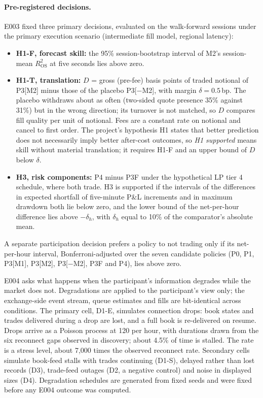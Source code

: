 \documentclass[11pt]{article}
\makeatletter
\newcommand{\bp}{\,bp}
\newcommand{\Rsq}{R^2_{\mathrm{OS}}}
\renewcommand\subsection{\@startsection{subsection}{2}{\z@}{-3ex\@plus -1ex \@minus -.2ex}{1ex \@plus .2ex}{\normalfont\normalsize\bfseries}}
\makeatother
\begin{document}
\paragraph{Pre-registered decisions.} E003 fixed three primary decisions, evaluated on the walk-forward sessions under
the primary execution scenario (intermediate fill model, regional latency):
\begin{itemize}
  \item \textbf{H1-F, forecast skill:} the 95\% session-bootstrap interval of M2's session-mean $\Rsq$ at five seconds
  lies above zero.
  \item \textbf{H1-T, translation:} $D$ = gross (pre-fee) basis points of traded notional of P3[M2] minus those of the
  placebo P3[$-$M2], with margin $\delta=0.5$\bp. The placebo withdraws about as often (two-sided quote presence 35\%
  against 31\%) but in the wrong direction; its turnover is not matched, so $D$ compares fill quality per unit of
  notional. Fees are a constant rate on notional and cancel to first order.
  The project's hypothesis H1 states that better prediction does not necessarily imply better after-cost outcomes, so
  \emph{H1 supported} means skill without material translation; it requires H1-F and an upper bound of $D$ below $\delta$.
  \item \textbf{H3, risk components:} P4 minus P3F under the hypothetical LP tier 4 schedule, where both trade. H3 is
  supported if the intervals of the differences in expected shortfall of five-minute P\&L increments and in maximum
  drawdown both lie below zero, and the lower bound of the net-per-hour difference lies above $-\delta_h$, with
  $\delta_h$ equal to 10\% of the comparator's absolute mean.
\end{itemize}
A separate participation decision prefers a policy to not trading only if its net-per-hour interval,
Bonferroni-adjusted over the seven candidate policies (P0, P1, P3[M1], P3[M2], P3[$-$M2], P3F and P4), lies above zero.

\subsection{Information degradation and E004}\label{sec:e004}

E004 asks what happens when the participant's information degrades while the market does not. Degradations are applied
to the participant's view only; the exchange-side event stream, queue estimates and fills are bit-identical across
conditions. The primary cell, D1-E, simulates connection drops: book states and trades delivered during a drop are lost,
and a full book is re-delivered on resume. Drops arrive as a Poisson process at 120 per hour, with durations drawn from
the six reconnect gaps observed in discovery; about 4.5\% of time is stalled. The rate is a stress level, about 7{,}000
times the observed reconnect rate. Secondary cells simulate book-feed stalls with trades continuing (D1-S), delayed
rather than lost records (D3), trade-feed outages (D2, a negative control) and noise in displayed sizes (D4). Degradation
schedules are generated from fixed seeds and were fixed before any E004 outcome was computed.
\end{document}
